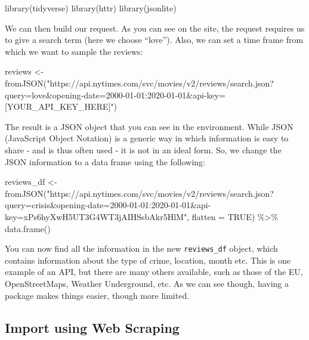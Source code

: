 \documentclass[
]{article}
\newenvironment{Shaded}{\begin{snugshade}}{\end{snugshade}}
\newcommand{\AttributeTok}[1]{\textcolor[rgb]{0.77,0.63,0.00}{#1}}
\newcommand{\ConstantTok}[1]{\textcolor[rgb]{0.00,0.00,0.00}{#1}}
\newcommand{\FunctionTok}[1]{\textcolor[rgb]{0.00,0.00,0.00}{#1}}
\newcommand{\NormalTok}[1]{#1}
\newcommand{\OtherTok}[1]{\textcolor[rgb]{0.56,0.35,0.01}{#1}}
\newcommand{\SpecialCharTok}[1]{\textcolor[rgb]{0.00,0.00,0.00}{#1}}
\newcommand{\StringTok}[1]{\textcolor[rgb]{0.31,0.60,0.02}{#1}}
\begin{document}
\begin{Shaded}
\begin{Highlighting}[]
\FunctionTok{library}\NormalTok{(tidyverse)}
\FunctionTok{library}\NormalTok{(httr)}
\FunctionTok{library}\NormalTok{(jsonlite)}
\end{Highlighting}
\end{Shaded}

We can then build our request. As you can see on the site, the request requires us to give a search term (here we choose ``love''). Also, we can set a time frame from which we want to sample the reviews:

\begin{Shaded}
\begin{Highlighting}[]
\NormalTok{reviews }\OtherTok{\textless{}{-}} \FunctionTok{fromJSON}\NormalTok{(}\StringTok{"https://api.nytimes.com/svc/movies/v2/reviews/search.json?query=love\&opening{-}date=2000{-}01{-}01:2020{-}01{-}01\&api{-}key=[YOUR\_API\_KEY\_HERE]"}\NormalTok{)}
\end{Highlighting}
\end{Shaded}

The result is a JSON object that you can see in the environment. While JSON (JavaScript Object Notation) is a generic way in which information is easy to share - and is thus often used - it is not in an ideal form. So, we change the JSON information to a data frame using the following:

\begin{Shaded}
\begin{Highlighting}[]
\NormalTok{reviews\_df }\OtherTok{\textless{}{-}} \FunctionTok{fromJSON}\NormalTok{(}\StringTok{"https://api.nytimes.com/svc/movies/v2/reviews/search.json?query=crisis\&opening{-}date=2000{-}01{-}01:2020{-}01{-}01\&api{-}key=xPs6hyXwH5UT3G4WT3jAIHSsbAkr5HlM"}\NormalTok{, }\AttributeTok{flatten =} \ConstantTok{TRUE}\NormalTok{) }\SpecialCharTok{\%\textgreater{}\%} 
 \FunctionTok{data.frame}\NormalTok{()}
\end{Highlighting}
\end{Shaded}

You can now find all the information in the new \texttt{reviews\_df} object, which contains information about the type of crime, location, month etc. This is one example of an API, but there are many others available, such as those of the EU, OpenStreetMaps, Weather Underground, etc. As we can see though, having a package makes things easier, though more limited.

\hypertarget{import-using-web-scraping}{%
\subsection{Import using Web Scraping}\label{import-using-web-scraping}}
\end{document}
